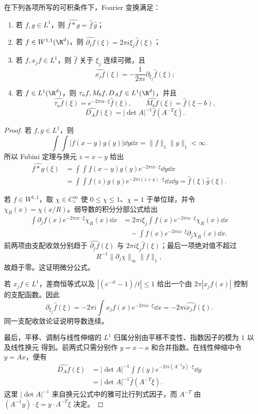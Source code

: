 \begin{proposition}[代数公式]\label{proposition:7-2-2-2}
在下列各项所写的可积条件下，Fourier 变换满足：
\begin{enumerate}
  \item 若 $f,g\in L^1$，则
  $\widehat{f*g}=\widehat f\,\widehat g$；
  \item 若 $f\in W^{1,1}(\R^d)$，则
  $\widehat{\partial_jf}(\xi)=2\pi i\xi_j\widehat f(\xi)$；
  \item 若 $f,x_jf\in L^1$，则 $\widehat f$ 关于 $\xi_j$ 连续可微，且
  \[
    \widehat{x_jf}(\xi)=-\frac1{2\pi i}\partial_{\xi_j}\widehat f(\xi);
  \]
  \item 若 $f\in L^1(\R^d)$，则 $\tau_af,M_bf,D_Af\in L^1(\R^d)$，并且
  \[
    \widehat{\tau_af}(\xi)=e^{-2\pi ia\cdot\xi}\widehat f(\xi),
    \qquad
    \widehat{M_bf}(\xi)=\widehat f(\xi-b),
  \]
  \[
    \widehat{D_Af}(\xi)=|\det A|^{-1}\widehat f(A^{-T}\xi).
  \]
\end{enumerate}
\end{proposition}

\begin{proof}
若 $f,g\in L^1$，则
\[
 \int\!\!\int |f(x-y)g(y)|\dd y\dd x=\|f\|_1\|g\|_1<\infty.
\]
所以 Fubini 定理与换元 $z=x-y$ 给出
\begin{align*}
 \widehat{f*g}(\xi)
 &=\int\!\!\int f(x-y)g(y)e^{-2\pi ix\cdot\xi}\dd y\dd x\\
 &=\int\!\!\int f(z)g(y)e^{-2\pi i(z+y)\cdot\xi}\dd z\dd y
 =\widehat f(\xi)\widehat g(\xi).
\end{align*}

若 $f\in W^{1,1}$，取 $\chi\in C_c^\infty$ 使
$0\leq\chi\leq1$、$\chi=1$ 于单位球，并令 $\chi_R(x)=\chi(x/R)$。弱导数的积分分部公式给出
\begin{align*}
 \int \partial_jf(x)e^{-2\pi ix\cdot\xi}\chi_R(x)\dd x
 &=2\pi i\xi_j\int f(x)e^{-2\pi ix\cdot\xi}\chi_R(x)\dd x\\
 &\quad-\int f(x)e^{-2\pi ix\cdot\xi}\partial_j\chi_R(x)\dd x.
\end{align*}
前两项由支配收敛分别趋于 $\widehat{\partial_jf}(\xi)$ 与
$2\pi i\xi_j\widehat f(\xi)$；最后一项绝对值不超过
\[
 R^{-1}\|\partial_j\chi\|_\infty\|f\|_1,
\]
故趋于零。这证明微分公式。

若 $x_jf\in L^1$，差商恒等式以及
$|(e^{-it}-1)/t|\leq1$ 给出一个由 $2\pi|x_jf(x)|$ 控制的支配函数。因此
\[
 \partial_{\xi_j}\widehat f(\xi)
 =-2\pi i\int x_jf(x)e^{-2\pi ix\cdot\xi}\dd x
 =-2\pi i\widehat{x_jf}(\xi).
\]
同一支配收敛论证说明导数连续。

最后，平移、调制与线性伸缩的 $L^1$ 归属分别由平移不变性、指数因子的模为 $1$ 以及线性换元
得到。前两式只需分别作 $y=x-a$ 和合并指数。在线性伸缩中令 $y=Ax$，便有
\begin{align*}
 \widehat{D_Af}(\xi)
 &=|\det A|^{-1}\int f(y)e^{-2\pi i(A^{-1}y)\cdot\xi}\dd y\\
 &=|\det A|^{-1}\widehat f(A^{-T}\xi).
\end{align*}
这里 $|\det A|^{-1}$ 来自换元公式中的雅可比行列式因子，而 $A^{-T}$ 由
$(A^{-1}y)\cdot\xi=y\cdot A^{-T}\xi$ 决定。
\end{proof}

